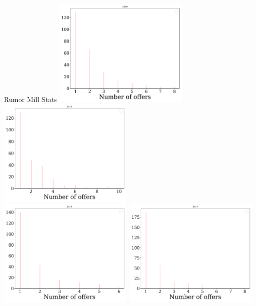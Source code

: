 \documentclass[10pt]{beamer}
\begin{document}
\begin{frame}{Rumor Mill Stats}
\includegraphics[width=0.49\textwidth]{offers_2020.pdf}~\includegraphics[width=0.49\textwidth]{offers_2019.pdf}\\
\includegraphics[width=0.49\textwidth]{offers_2018.pdf}~\includegraphics[width=0.49\textwidth]{offers_2017.pdf}
\end{frame}
\end{document}
